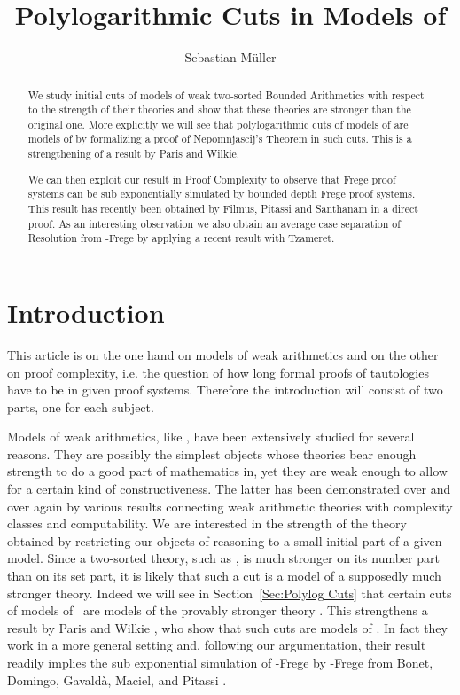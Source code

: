 \documentclass{LMCS}
\title{Polylogarithmic Cuts in Models of \VZ}
\author[S.~M\"uller]{Sebastian M\"uller}
\begin{document}
\begin{abstract}
  We study initial cuts of models of weak two-sorted Bounded
  Arithmetics with respect to the strength of their theories and show
  that these theories are stronger than the original one. More
  explicitly we will see that polylogarithmic cuts of models of 
  are models of  by formalizing a proof of Nepomnjascij's
  Theorem in such cuts.  This is a strengthening of a result by Paris
  and Wilkie.

  We can then exploit our result in Proof Complexity to observe that
  Frege proof systems can be sub exponentially simulated by bounded
  depth Frege proof systems. This result has recently been obtained by
  Filmus, Pitassi and Santhanam in a direct proof. As an
  interesting observation we also obtain an average case separation of
  Resolution from -Frege by applying a recent result
  with Tzameret.
\end{abstract}


\maketitle


\section{Introduction}

This article is on the one hand on models of weak arithmetics and on the other on proof complexity, i.e. the
question of how long formal proofs of tautologies have to be in given proof systems. Therefore the introduction
will consist of two parts, one for each subject.

Models of weak arithmetics, like , have been extensively studied for several reasons. They are
possibly the simplest objects whose theories bear enough strength to do a good part of mathematics in, yet they
are weak enough to allow for a certain kind of constructiveness. The latter has been demonstrated over and over
again by various results connecting weak arithmetic theories with complexity classes and computability. We are
interested in the strength of the theory obtained by restricting our objects of reasoning to a small initial
part of a given model. Since a two-sorted theory, such as \VZ, is much stronger on its number part than on its
set part, it is likely that such a cut is a model of a supposedly much stronger theory. Indeed we will see in
Section~\ref{Sec:Polylog Cuts} that certain cuts of models of \VZ\ are models of the provably stronger theory
. This strengthens a result by Paris and Wilkie \cite{PW87}\cite{PW85}, who show that such cuts are
models of . In fact they work in a more general setting and, following our argumentation, their
result readily implies the sub exponential simulation of -Frege by -Frege from
Bonet, Domingo, Gavald\`a, Maciel, and Pitassi \cite{BDGMP04}.
\end{document}

